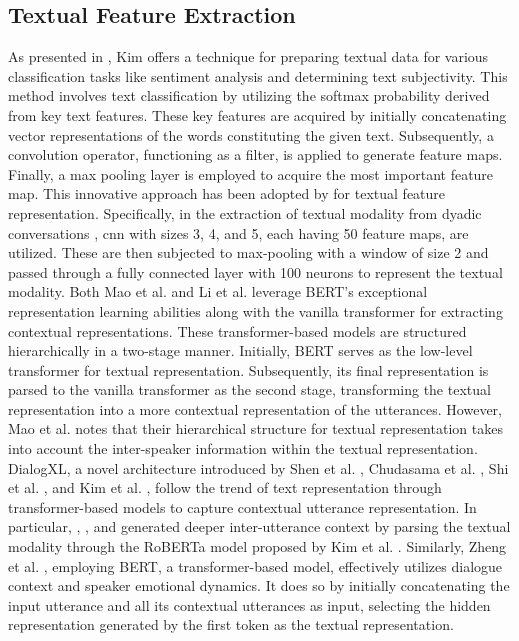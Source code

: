     \subsection{Textual Feature Extraction}
    As presented in \cite{cnn-text}, Kim offers a technique for preparing textual data for various classification tasks like sentiment analysis and determining text subjectivity. This method involves text classification by utilizing the softmax probability derived from key text features. These key features are acquired by initially concatenating vector representations of the words constituting the given text. Subsequently, a convolution operator, functioning as a filter, is applied to generate feature maps. Finally, a max pooling layer is employed to acquire the most important feature map. This innovative approach has been adopted by \cite{cmn, dialoguernn, bclstm} for textual feature representation. Specifically, in the extraction of textual modality from dyadic conversations \cite{iemocap}, \ac{cnn} with sizes 3, 4, and 5, each having 50 feature maps, are utilized. These are then subjected to max-pooling with a window of size 2 and passed through a fully connected layer with 100 neurons to represent the textual modality. Both Mao et al. \cite{dialoguetrm} and Li et al. \cite{hitrans} leverage BERT's \cite{bert}  exceptional representation learning abilities along with the vanilla transformer \cite{attention} for extracting contextual representations. These transformer-based models are structured hierarchically in a two-stage manner. Initially, BERT serves as the low-level transformer for textual representation. Subsequently, its final representation is parsed to the vanilla transformer as the second stage, transforming the textual representation into a more contextual representation of the utterances. However, Mao et al. \cite{dialoguetrm} notes that their hierarchical structure for textual representation takes into account the inter-speaker information within the textual representation. DialogXL, a novel architecture introduced by Shen et al. \cite{dialogxl}, Chudasama et al. \cite{m2fnet}, Shi et al. \cite{multiemo}, and Kim et al. \cite{emoberta}, follow the trend of text representation through transformer-based models to capture contextual utterance representation. In particular, \cite{m2fnet}, \cite{multiemo}, and \cite{emoberta} generated deeper inter-utterance context by parsing the textual modality through the RoBERTa model proposed by Kim et al. \cite{roberta}. Similarly, Zheng et al. \cite{fmmt}, employing BERT, a transformer-based model, effectively utilizes dialogue context and speaker emotional dynamics. It does so by initially concatenating the input utterance and all its contextual utterances as input, selecting the hidden representation generated by the first token as the textual representation.

